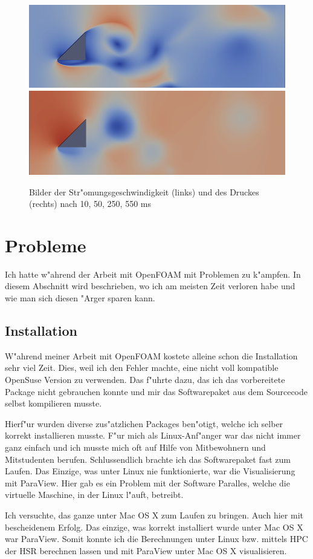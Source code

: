 \begin{refsection}
\begin{figure}
\begin{center}
\\[0.5mm]
\includegraphics[width = 0.49\hsize]{./openfoam/pics/U55.png}
\includegraphics[width = 0.49\hsize]{./openfoam/pics/p55.png}
\end{center}
\caption{Bilder der Str"omungsgeschwindigkeit (links) und des Druckes
(rechts) nach 10, 50, 250, 550 ms}
\end{figure}

\section{Probleme}
Ich hatte w"ahrend der Arbeit mit OpenFOAM mit Problemen zu k"ampfen. In
diesem Abschnitt wird beschrieben, wo ich am meisten Zeit verloren habe
und wie man sich diesen "Arger sparen kann.

\subsection{Installation}
W"ahrend meiner Arbeit mit OpenFOAM kostete alleine schon die Installation
sehr viel Zeit. Dies, weil ich den Fehler machte, eine nicht voll
kompatible OpenSuse Version zu verwenden. Das f"uhrte dazu, das ich das
vorbereitete Package nicht gebrauchen konnte und mir das Softwarepaket
aus dem Sourcecode selbst kompilieren musste.

Hierf"ur wurden diverse zus"atzlichen Packages ben"otigt, welche ich
selber korrekt installieren musste. F"ur mich als Linux-Anf"anger
war das nicht immer ganz einfach und ich musste mich oft auf Hilfe
von Mitbewohnern und Mitstudenten berufen. Schlussendlich brachte ich
das Softwarepaket fast zum Laufen. Das Einzige, was unter Linux nie
funktionierte, war die Visualisierung mit ParaView. Hier gab es ein
Problem mit der Software Paralles, welche die virtuelle Maschine, in
der Linux l"auft, betreibt.

Ich versuchte, das ganze unter Mac OS X zum Laufen zu bringen. Auch hier
mit bescheidenem Erfolg. Das einzige, was korrekt installiert wurde
unter Mac OS X war ParaView. Somit konnte ich die Berechnungen unter
Linux bzw. mittels HPC der HSR berechnen lassen und mit ParaView unter
Mac OS X visualisieren.


\end{refsection}
